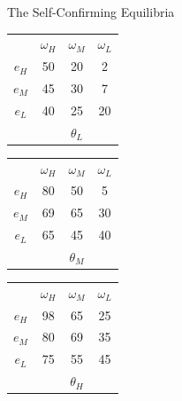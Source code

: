\documentclass[aspectratio=169]{beamer}
\begin{document}
\begin{frame}{The Self-Confirming Equilibria}

\centering
\begin{tabular}{ c|c|c|c|}
  
  \multicolumn{1}{c}{} & \multicolumn{1}{c}{$\omega_H$} & \multicolumn{1}{c}{$\omega_M$} & \multicolumn{1}{c}{$\omega_L$}\\
  \cline{2-4}
  $e_H$ & \cellcolor[HTML]{b84f79}50 & 20 & 2 \\
  \cline{2-4}
  $e_M$ & 45 & \cellcolor[HTML]{5f94b8}30 & 7 \\
  \cline{2-4}
  $e_L$ & \cellcolor[HTML]{69a35b}40 & 25 & 20 \\
  \cline{2-4}
  \multicolumn{1}{c}{} & \multicolumn{1}{c}{} & \multicolumn{1}{c}{$\theta_L$} & \multicolumn{1}{c}{}\\
\end{tabular}
\hspace{.3cm} %
\begin{tabular}{ c|c|c|c|}
  
  \multicolumn{1}{c}{} & \multicolumn{1}{c}{$\omega_H$} & \multicolumn{1}{c}{$\omega_M$} & \multicolumn{1}{c}{$\omega_L$}\\
  \cline{2-4}
  $e_H$ & 80 & \cellcolor[HTML]{b84f79}50 & 5 \\
  \cline{2-4}
  $e_M$ & \cellcolor[HTML]{fab143}69 & 65 & \cellcolor[HTML]{5f94b8}30 \\
  \cline{2-4}
  $e_L$ & 65 & \cellcolor[HTML]{9662f0}45 & \cellcolor[HTML]{69a35b}40 \\
  \cline{2-4}
  \multicolumn{1}{c}{} & \multicolumn{1}{c}{} & \multicolumn{1}{c}{$\theta_M$} & \multicolumn{1}{c}{}\\
\end{tabular}
\hspace{.3cm} %
\begin{tabular}{ c|c|c|c|}
  
  \multicolumn{1}{c}{} & \multicolumn{1}{c}{$\omega_H$} & \multicolumn{1}{c}{$\omega_M$} & \multicolumn{1}{c}{$\omega_L$}\\
  \cline{2-4}
  $e_H$ & 98 & 65 & 25 \\
  \cline{2-4}
  $e_M$ & 80 & \cellcolor[HTML]{fab143}69 & 35 \\
  \cline{2-4}
  $e_L$ & 75 & 55 & \cellcolor[HTML]{9662f0}45 \\
  \cline{2-4}
  \multicolumn{1}{c}{} & \multicolumn{1}{c}{} & \multicolumn{1}{c}{$\theta_H$} & \multicolumn{1}{c}{}\\
\end{tabular}
\end{frame}
\end{document}
